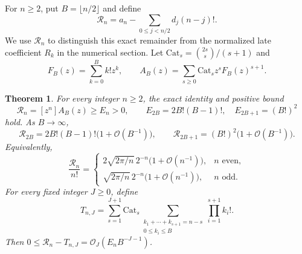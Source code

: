 \documentclass[11pt,letterpaper]{article}
\numberwithin{equation}{section}
\newtheorem{theorem}{Theorem}[section]
\theoremstyle{remark}\newtheorem{remark}[theorem]{Remark}
\newcommand{\Ord}{\mathcal O}
\begin{document}
For $n\ge2$, put $B=\lfloor n/2\rfloor$ and define
\begin{equation}\label{eq:R-def}
 \mathcal R_n=a_n-\sum_{0\le j<n/2}d_j(n-j)!.
\end{equation}
We use $\mathcal R_n$ to distinguish this exact remainder from the normalized late coefficient $R_k$ in the numerical section. Let $\mathrm{Cat}_s=\binom{2s}{s}/(s+1)$ and
\[
 F_B(z)=\sum_{k=0}^{B}k!z^k,\qquad
 A_B(z)=\sum_{s\ge0}\mathrm{Cat}_s z^sF_B(z)^{s+1}.
\]

\begin{theorem}\label{thm:half}
For every integer $n\ge2$, the exact identity and positive bound
\begin{equation}\label{eq:positive-identity}
 \mathcal R_n=[z^n]A_B(z)\ge E_n>0,
 \qquad
 E_{2B}=2B!(B-1)!,\quad E_{2B+1}=(B!)^2
\end{equation}
hold. As $B\to\infty$,
\begin{equation}\label{eq:half-leading}
 \mathcal R_{2B}=2B!(B-1)!\bigl(1+\Ord(B^{-1})\bigr),\qquad
 \mathcal R_{2B+1}=(B!)^2\bigl(1+\Ord(B^{-1})\bigr).
\end{equation}
Equivalently,
\begin{equation}\label{eq:half-normal}
 \frac{\mathcal R_n}{n!}
 =\begin{cases}
  2\sqrt{2\pi/n}\,2^{-n}\bigl(1+\Ord(n^{-1})\bigr),&n\text{ even},\\
  \sqrt{2\pi/n}\,2^{-n}\bigl(1+\Ord(n^{-1})\bigr),&n\text{ odd}.
 \end{cases}
\end{equation}
For every fixed integer $J\ge0$, define
\begin{equation}\label{eq:sector}
 T_{n,J}=\sum_{s=1}^{J+1}\mathrm{Cat}_s
     \sum_{\substack{k_1+\cdots+k_{s+1}=n-s\\0\le k_i\le B}}
                       \prod_{i=1}^{s+1}k_i!.
\end{equation}
Then $0\le\mathcal R_n-T_{n,J}=\Ord_J(E_nB^{-J-1})$.
\end{theorem}
\end{document}
